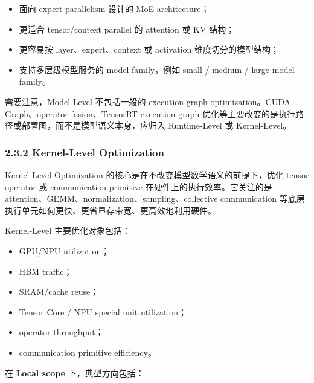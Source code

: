 \documentclass[a4paper,10pt]{ctexart}
\begin{document}
\begin{itemize}
\item 面向 expert parallelism 设计的 MoE architecture；

\item 更适合 tensor/context parallel 的 attention 或 KV 结构；

\item 更容易按 layer、expert、context 或 activation 维度切分的模型结构；

\item 支持多层级模型服务的 model family，例如 small / medium / large model family。

\end{itemize}
需要注意，Model-Level 不包括一般的 execution graph optimization。CUDA Graph、operator fusion、TensorRT execution graph 优化等主要改变的是执行路径或部署图，而不是模型语义本身，应归入 Runtime-Level 或 Kernel-Level。




\subsubsection*{2.3.2 Kernel-Level Optimization}

Kernel-Level Optimization 的核心是在不改变模型数学语义的前提下，优化 tensor operator 或 communication primitive 在硬件上的执行效率。它关注的是 attention、GEMM、normalization、sampling、collective communication 等底层执行单元如何更快、更省显存带宽、更高效地利用硬件。


Kernel-Level 主要优化对象包括：


\begin{itemize}
\item GPU/NPU utilization；

\item HBM traffic；

\item SRAM/cache reuse；

\item Tensor Core / NPU special unit utilization；

\item operator throughput；

\item communication primitive efficiency。

\end{itemize}
在 \textbf{Local scope} 下，典型方向包括：
\end{document}
